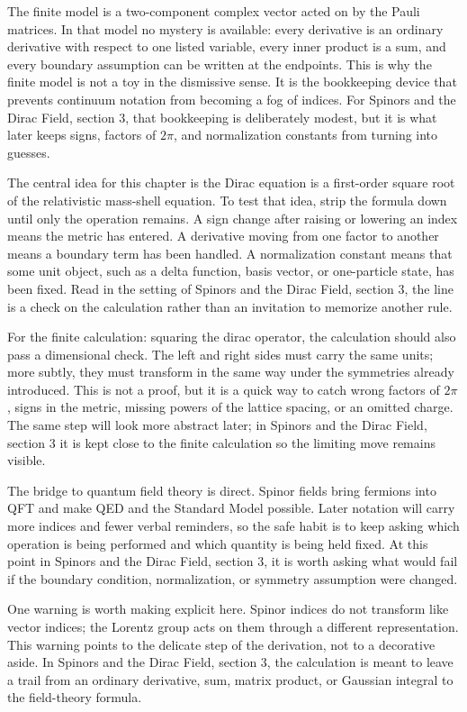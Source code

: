 The finite model is a two-component complex vector acted on by the Pauli matrices.  In that model no mystery is available: every derivative is an ordinary derivative with respect to one listed variable, every inner product is a sum, and every boundary assumption can be written at the endpoints.  This is why the finite model is not a toy in the dismissive sense.  It is the bookkeeping device that prevents continuum notation from becoming a fog of indices.  For Spinors and the Dirac Field, section 3, that bookkeeping is deliberately modest, but it is what later keeps signs, factors of \(2\pi\), and normalization constants from turning into guesses.

The central idea for this chapter is the Dirac equation is a first-order square root of the relativistic mass-shell equation.  To test that idea, strip the formula down until only the operation remains.  A sign change after raising or lowering an index means the metric has entered.  A derivative moving from one factor to another means a boundary term has been handled.  A normalization constant means that some unit object, such as a delta function, basis vector, or one-particle state, has been fixed.  Read in the setting of Spinors and the Dirac Field, section 3, the line is a check on the calculation rather than an invitation to memorize another rule.

For the finite calculation: squaring the dirac operator, the calculation should also pass a dimensional check.  The left and right sides must carry the same units; more subtly, they must transform in the same way under the symmetries already introduced.  This is not a proof, but it is a quick way to catch wrong factors of \(2\pi\), signs in the metric, missing powers of the lattice spacing, or an omitted charge.  The same step will look more abstract later; in Spinors and the Dirac Field, section 3 it is kept close to the finite calculation so the limiting move remains visible.

The bridge to quantum field theory is direct.  Spinor fields bring fermions into QFT and make QED and the Standard Model possible.  Later notation will carry more indices and fewer verbal reminders, so the safe habit is to keep asking which operation is being performed and which quantity is being held fixed.  At this point in Spinors and the Dirac Field, section 3, it is worth asking what would fail if the boundary condition, normalization, or symmetry assumption were changed.

One warning is worth making explicit here.  Spinor indices do not transform like vector indices; the Lorentz group acts on them through a different representation.  This warning points to the delicate step of the derivation, not to a decorative aside.  In Spinors and the Dirac Field, section 3, the calculation is meant to leave a trail from an ordinary derivative, sum, matrix product, or Gaussian integral to the field-theory formula.

